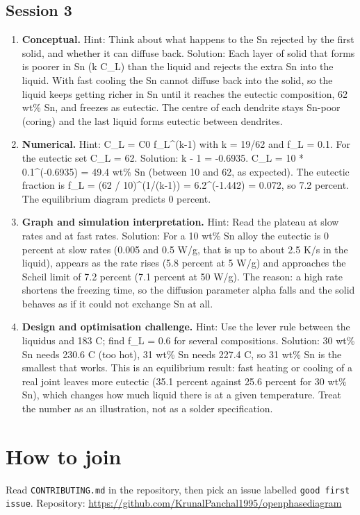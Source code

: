 \documentclass[11pt,a4paper]{article}
\begin{document}
\subsection*{Session 3}
\begin{enumerate}[nosep]
\item \textbf{Conceptual.} Hint: Think about what happens to the Sn rejected by the first solid, and whether it can diffuse back. Solution: Each layer of solid that forms is poorer in Sn (k C\_L) than the liquid and rejects the extra Sn into the liquid. With fast cooling the Sn cannot diffuse back into the solid, so the liquid keeps getting richer in Sn until it reaches the eutectic composition, 62 wt\% Sn, and freezes as eutectic. The centre of each dendrite stays Sn-poor (coring) and the last liquid forms eutectic between dendrites.
\item \textbf{Numerical.} Hint: C\_L = C0 f\_L\textasciicircum{}(k-1) with k = 19/62 and f\_L = 0.1. For the eutectic set C\_L = 62. Solution: k - 1 = -0.6935. C\_L = 10 * 0.1\textasciicircum{}(-0.6935) = 49.4 wt\% Sn (between 10 and 62, as expected). The eutectic fraction is f\_L = (62 / 10)\textasciicircum{}(1/(k-1)) = 6.2\textasciicircum{}(-1.442) = 0.072, so 7.2 percent. The equilibrium diagram predicts 0 percent.
\item \textbf{Graph and simulation interpretation.} Hint: Read the plateau at slow rates and at fast rates. Solution: For a 10 wt\% Sn alloy the eutectic is 0 percent at slow rates (0.005 and 0.5 W/g, that is up to about 2.5 K/s in the liquid), appears as the rate rises (5.8 percent at 5 W/g) and approaches the Scheil limit of 7.2 percent (7.1 percent at 50 W/g). The reason: a high rate shortens the freezing time, so the diffusion parameter alpha falls and the solid behaves as if it could not exchange Sn at all.
\item \textbf{Design and optimisation challenge.} Hint: Use the lever rule between the liquidus and 183 C; find f\_L = 0.6 for several compositions. Solution: 30 wt\% Sn needs 230.6 C (too hot), 31 wt\% Sn needs 227.4 C, so 31 wt\% Sn is the smallest that works. This is an equilibrium result: fast heating or cooling of a real joint leaves more eutectic (35.1 percent against 25.6 percent for 30 wt\% Sn), which changes how much liquid there is at a given temperature. Treat the number as an illustration, not as a solder specification.
\end{enumerate}

\section{How to join}
Read \texttt{CONTRIBUTING.md} in the repository, then pick an issue labelled \texttt{good first issue}. Repository: \url{https://github.com/KrunalPanchal1995/openphasediagram}
\end{document}
